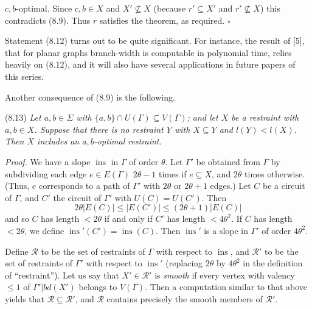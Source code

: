 \noindent $c, b$-optimal. Since $c, b \in X$ and $X' \nsubseteq X$ (because $r' \subseteq X'$ and $r' \nsubseteq X$) this contradicts (8.9). Thus $r$ satisfies the theorem, as required. $\square$

Statement (8.12) turns out to be quite significant. For instance, the result of [5], that for planar graphs branch-width is computable in polynomial time, relies heavily on (8.12), and it will also have several applications in future papers of this series.

Another consequence of (8.9) is the following.

\stmt
(8.13) \textit{Let $a, b \in \Sigma$ with $\{a, b\} \cap U(\Gamma) \subseteq V(\Gamma)$; and let $X$ be a restraint with $a, b \in X$. Suppose that there is no restraint $Y$ with $X \subseteq Y$ and $l(Y) < l(X)$. Then $X$ includes an $a, b$-optimal restraint.}

\textit{Proof.} We have a slope $\operatorname{ins}$ in $\Gamma$ of order $\theta$. Let $\Gamma'$ be obtained from $\Gamma$ by subdividing each edge $e \in E(\Gamma)$ $2\theta - 1$ times if $e \subseteq X$, and $2\theta$ times otherwise. (Thus, $e$ corresponds to a path of $\Gamma'$ with $2\theta$ or $2\theta + 1$ edges.) Let $C$ be a circuit of $\Gamma$, and $C'$ the circuit of $\Gamma'$ with $U(C) = U(C')$. Then
\begin{equation*}
2\theta |E(C)| \le |E(C')| \le (2\theta + 1) |E(C)|
\end{equation*}
and so $C$ has length $<2\theta$ if and only if $C'$ has length $<4\theta^2$. If $C$ has length $<2\theta$, we define $\operatorname{ins}'(C') = \operatorname{ins}(C)$. Then $\operatorname{ins}'$ is a slope in $\Gamma'$ of order $4\theta^2$.

Define $\mathscr{R}$ to be the set of restraints of $\Gamma$ with respect to $\operatorname{ins}$, and $\mathscr{R}'$ to be the set of restraints of $\Gamma'$ with respect to $\operatorname{ins}'$ (replacing $2\theta$ by $4\theta^2$ in the definition of ``restraint''). Let us say that $X' \in \mathscr{R}'$ is \textit{smooth} if every vertex with valency $\le 1$ of $\Gamma' | bd(X')$ belongs to $V(\Gamma)$. Then a computation similar to that above yields that $\mathscr{R} \subseteq \mathscr{R}'$, and $\mathscr{R}$ contains precisely the smooth members of $\mathscr{R}'$.

